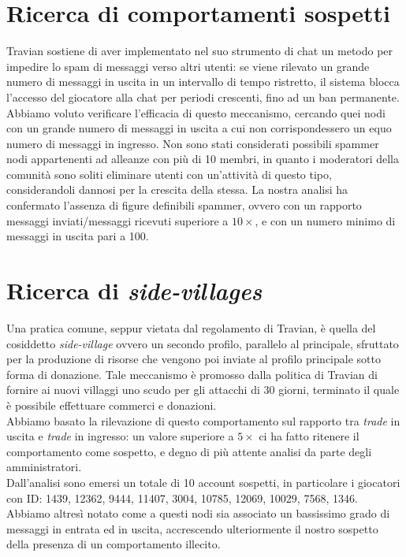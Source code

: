 \section{Ricerca di comportamenti sospetti}
Travian sostiene di aver implementato nel suo strumento di chat un metodo per impedire lo spam di messaggi verso altri utenti: se viene rilevato un grande numero di messaggi in uscita in un intervallo di tempo ristretto, il sistema blocca l'accesso del giocatore alla chat per periodi crescenti, fino ad un ban permanente.\\
Abbiamo voluto verificare l'efficacia di questo meccanismo, cercando quei nodi con un grande numero di messaggi in uscita a cui non corrispondessero un equo numero di messaggi in ingresso.
Non sono stati considerati possibili spammer nodi appartenenti ad alleanze con più di 10 membri, in quanto i moderatori della comunità sono soliti eliminare utenti con un'attività di questo tipo, considerandoli dannosi per la crescita della stessa.
La nostra analisi ha confermato l'assenza di figure definibili spammer, ovvero con un rapporto messaggi inviati/messaggi ricevuti superiore a $10\times$, e con un numero minimo di messaggi in uscita pari a 100.

\section{Ricerca di \textit{side-villages}}
Una pratica comune, seppur vietata dal regolamento di Travian, è quella del cosiddetto \textit{side-village} ovvero un secondo profilo, parallelo al principale, sfruttato per la produzione di risorse che vengono poi inviate al profilo principale sotto forma di donazione. Tale meccanismo è promosso dalla politica di Travian di fornire ai nuovi villaggi uno scudo per gli attacchi di 30 giorni, terminato il quale è possibile effettuare commerci e donazioni.\\
Abbiamo basato la rilevazione di questo comportamento sul rapporto tra \textit{trade} in uscita e \textit{trade} in ingresso: un valore superiore a $5\times$ ci ha fatto ritenere il comportamento come sospetto, e degno di più attente analisi da parte degli amministratori.\\
Dall'analisi sono emersi un totale di 10 account sospetti, in particolare i giocatori con ID: 1439, 12362, 9444, 11407, 3004, 10785, 12069, 10029, 7568, 1346.\\
Abbiamo altresì notato come a questi nodi sia associato un bassissimo grado di messaggi in entrata ed in uscita, accrescendo ulteriormente il nostro sospetto della presenza di un comportamento illecito.

